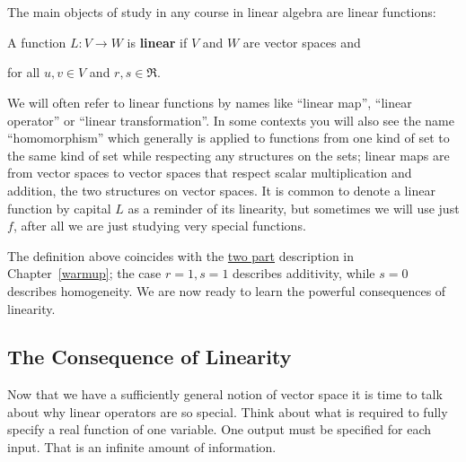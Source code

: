
\chapter{\linTransTitle}
\label{sec:linearTransformation}

The main objects of study in any course in linear algebra are linear functions:

\begin{definition}
A function $L \colon V\rightarrow W$ is {\bfseries linear} if $V$ and $W$ are vector spaces and 
\begin{center}
\end{center}
 for all $u,v \in V$ and $r,s \in \Re$.
\end{definition}



\begin{remark}
We will often refer to linear functions by names like ``linear map'', ``linear operator'' or ``linear transformation''. In some contexts
you will also see the name ``homomorphism'' which generally is applied to functions from one kind of set to the same kind of set while respecting any  structures on the sets; linear maps are from vector spaces to vector spaces that respect scalar multiplication and addition, the two structures on vector spaces. It is common to denote a linear function by capital $L$ as a reminder of its linearity, but sometimes we will use just $f$, after all we are just studying very special functions.
\end{remark}

The definition above coincides with the \hyperlink{twopart}{two part} description in Chapter~\ref{warmup};
the case $r=1,s=1$ describes additivity, while  $s=0$ describes homogeneity. 
We are now ready to learn the powerful consequences of linearity.

\section{The Consequence of Linearity}

Now that we have a sufficiently general notion of vector space 
it is time to talk about why linear operators are so special. 
Think about what is required to fully specify a real function of one variable. 
One output must be specified for each input. 
That is an infinite amount of information. 

